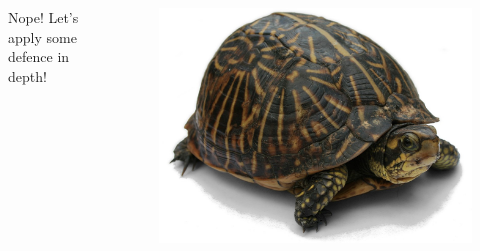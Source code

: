 \documentclass{beamer}
\begin{document}
\begin{frame}
    \begin{columns}
        \begin{column}{0.5\textwidth}
            Nope! Let's apply some defence in depth!
        \end{column}
        \begin{column}{0.5\textwidth}
            \begin{figure}
                \centering
                \includegraphics[width=\textwidth,keepaspectratio]{../resources/turtle.jpg}
            \end{figure}
        \end{column}
    \end{columns}
\end{frame}
\end{document}
